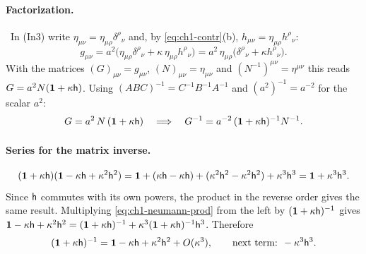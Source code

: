 \paragraph{Factorization.} \tD\ In (In3) write
$\eta_{\mu\nu}=\eta_{\mu\rho}\delta^\rho{}_\nu$ and, by
\eqref{eq:ch1-contr}(b), $h_{\mu\nu}=\eta_{\mu\rho}h^\rho{}_\nu$:
\begin{equation}
g_{\mu\nu}=a^2\big(\eta_{\mu\rho}\delta^\rho{}_\nu+\kappa\,\eta_{\mu\rho}h^\rho{}_\nu\big)=a^2\,\eta_{\mu\rho}\big(\delta^\rho{}_\nu+\kappa h^\rho{}_\nu\big).
\label{eq:ch1-factor}
\end{equation}
With the matrices $(G)_{\mu\nu}=g_{\mu\nu}$, $(N)_{\mu\nu}=\eta_{\mu\nu}$ and
$(N^{-1})^{\mu\nu}=\eta^{\mu\nu}$ this reads $G=a^2N(\mathbf{1}+\kappa\mathsf{h})$. Using
$(ABC)^{-1}=C^{-1}B^{-1}A^{-1}$ and $(a^2)^{-1}=a^{-2}$ for the scalar $a^2$:
\begin{equation}
G=a^2\,N\,(\mathbf{1}+\kappa\mathsf{h})\quad\Longrightarrow\quad G^{-1}=a^{-2}\,(\mathbf{1}+\kappa\mathsf{h})^{-1}N^{-1}.
\label{eq:ch1-Ginv}
\end{equation}

\paragraph{Series for the matrix inverse.} \tD
\begin{equation}
(\mathbf{1}+\kappa\mathsf{h})(\mathbf{1}-\kappa\mathsf{h}+\kappa^2\mathsf{h}^2)
=\mathbf{1}+(\kappa\mathsf{h}-\kappa\mathsf{h})+(\kappa^2\mathsf{h}^2-\kappa^2\mathsf{h}^2)+\kappa^3\mathsf{h}^3
=\mathbf{1}+\kappa^3\mathsf{h}^3 .
\label{eq:ch1-neumann-prod}
\end{equation}
Since $\mathsf{h}$ commutes with its own powers, the product in the reverse order gives
the same result. Multiplying \eqref{eq:ch1-neumann-prod} from the left by
$(\mathbf{1}+\kappa\mathsf{h})^{-1}$ gives
$\mathbf{1}-\kappa\mathsf{h}+\kappa^2\mathsf{h}^2=(\mathbf{1}+\kappa\mathsf{h})^{-1}+\kappa^3(\mathbf{1}+\kappa\mathsf{h})^{-1}\mathsf{h}^3$.
Therefore
\begin{equation}
(\mathbf{1}+\kappa\mathsf{h})^{-1}=\mathbf{1}-\kappa\mathsf{h}+\kappa^2\mathsf{h}^2+O(\kappa^3),\qquad\text{next term: }-\kappa^3\mathsf{h}^3 .
\label{eq:ch1-neumann}
\end{equation}

